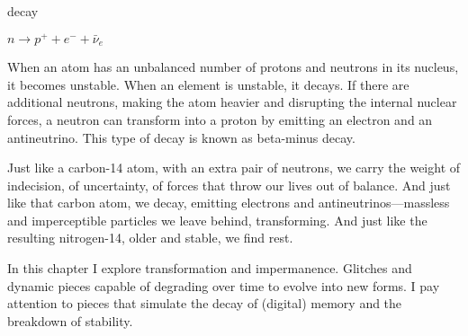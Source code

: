 \begin{center}
\Huge decay
\vspace{2cm}
\begin{flushright}
\large
\textit{ $n \rightarrow p^+ + e^- + \bar{\nu}_e$ }
\end{flushright}
\vspace{2cm}
\end{center}
\normalsize

When an atom has an unbalanced number of protons and neutrons in its nucleus, it becomes unstable. When an element is unstable, it decays. If there are additional neutrons, making the atom heavier and disrupting the internal nuclear forces, a neutron can transform into a proton by emitting an electron and an antineutrino. This type of decay is known as beta-minus decay.

Just like a carbon-14 atom, with an extra pair of neutrons, we carry the weight of indecision, of uncertainty, of forces that throw our lives out of balance. And just like that carbon atom, we decay, emitting electrons and antineutrinos—massless and imperceptible particles we leave behind, transforming. And just like the resulting nitrogen-14, older and stable, we find rest.

In this chapter I explore transformation and impermanence. Glitches and dynamic pieces capable of degrading over time to evolve into new forms. I pay attention to pieces that simulate the decay of (digital) memory and the breakdown of stability.  


